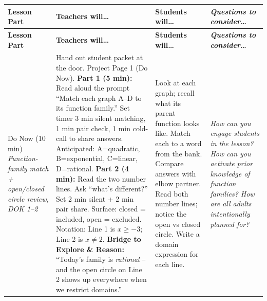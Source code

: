 \documentclass[10pt]{article}
\begin{document}
\vspace{0.6em}

\begin{xltabular}{\linewidth}{|>{\bfseries\RaggedRight\arraybackslash}p{1.4in}|Y|>{\RaggedRight\arraybackslash}p{1.9in}|>{\itshape\RaggedRight\arraybackslash}p{1.55in}|}
  \hline
  \textbf{Lesson Part} & \textbf{Teachers will\ldots} & \textbf{Students will\ldots} & \textbf{Questions to consider\ldots} \\ \hline
  \endfirsthead

  \hline
  \textbf{Lesson Part} & \textbf{Teachers will\ldots} & \textbf{Students will\ldots} & \textbf{Questions to consider\ldots} \\ \hline
  \endhead

  Do Now (10 min) \newline
  \emph{Function-family match + open/closed circle review, DOK 1--2}
  &
  Hand out student packet at the door. Project Page 1 (Do Now).     \newline
  \textbf{Part 1 (5 min):} Read aloud the prompt ``Match each graph A--D to its function family.'' Set timer 3 min silent matching, 1 min pair check, 1 min cold-call to share answers.     \newline
  Anticipated: A=quadratic, B=exponential, C=linear, D=rational.     \newline
  \textbf{Part 2 (4 min):} Read the two number lines. Ask ``what's different?'' Set 2 min silent + 2 min pair share. Surface: closed = included, open = excluded. Notation: Line 1 is $x \geq -3$; Line 2 is $x \neq 2$.     \newline\smallskip
  \textbf{Bridge to Explore \& Reason:} ``Today's family is \emph{rational} -- and the open circle on Line 2 shows up everywhere when we restrict domains.''
  &
  Look at each graph; recall what its parent function looks like.     \newline
  Match each to a word from the bank.     \newline
  Compare answers with elbow partner.     \newline
  Read both number lines; notice the open vs closed circle.     \newline
  Write a domain expression for each line.
  &
  How can you engage students in the lesson?     \newline
  How can you activate prior knowledge of function families?     \newline
  How are all adults intentionally planned for? \\ \hline


\end{xltabular}
\end{document}
